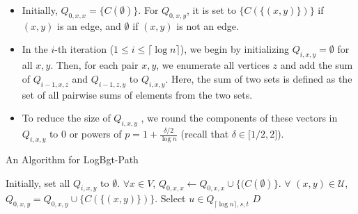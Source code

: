 \documentclass[11pt,a4paper]{article} \usepackage{enumitem}
\newcommand{\calU}{\mathcal{U}}
\newcommand{\LBOpath}{\textsf{LogBgt-Path}}
\theoremstyle{definition}
\begin{document}
\begin{itemize}
\item Initially, $Q_{0, x, x} = \{ C(\emptyset) \}$. For $Q_{0, x, y}$, it is set to $\{ C(\{(x, y)\}) \}$ if $(x, y)$ is an edge, and $\emptyset$ if $(x, y)$ is not an edge.

\item In the $i$-th iteration ($1 \leq i \leq \lceil \log n \rceil$), we begin by initializing $Q_{i, x, y} = \emptyset$ for all $x, y$. Then, for each pair $x, y$, we enumerate all vertices $z$ and add the sum of $Q_{i-1, x, z}$ and $Q_{i-1, z, y}$ to $Q_{i, x, y}$. Here, the sum of two sets is defined as the set of all pairwise sums of elements from the two sets.
 
\item To reduce the size of $Q_{i, x, y}$ , we round the components of these vectors in $Q_{i,x,y}$ to $0$ or powers of $p = 1 + \frac{\delta/2}{\log n}$ (recall that $\delta\in \lbrack 1/2,2\rbrack$).

\end{itemize}
\begin{algorithm}[H]
\caption{An Algorithm for \LBOpath}
\label{Algo-Path}
Initially, set all $Q_{i,x,y}$ to $\emptyset$.\;
$\forall x\in V$, $Q_{0,x,x}\gets Q_{0,x,x}\cup \lbrace (C(\emptyset) \rbrace$. \;
$\forall$ $(x,y)\in \calU$, $Q_{0,x,y}=Q_{0,x,y}\cup \lbrace C(\lbrace (x,y)\rbrace)\rbrace$.\; 
Select $u\in Q_{\lceil \log n\rceil,s,t}$\;
\Return $D$
\end{algorithm}
\end{document}
